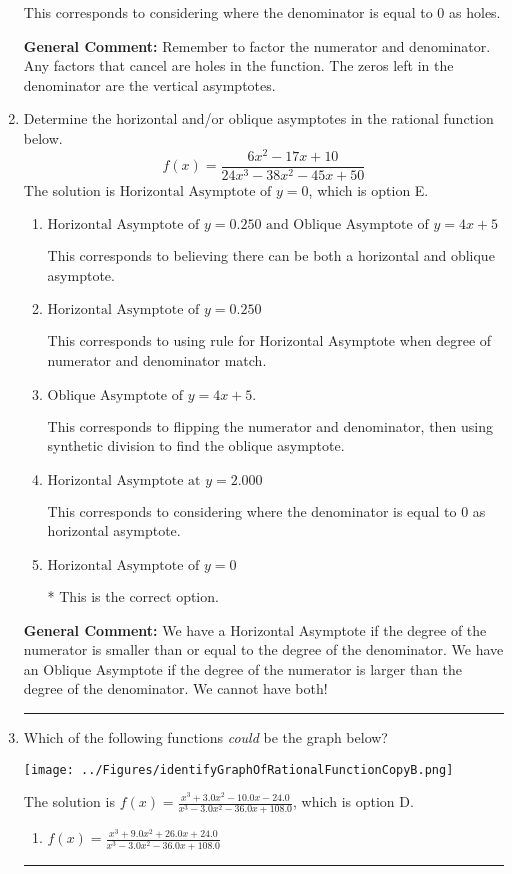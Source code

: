 \documentclass{extbook}[14pt]
\newcommand{\litem}[1]{\item #1

\rule{\textwidth}{0.4pt}}
\begin{document}
\begin{enumerate}
{\begin{enumerate}[label=\Alph*.]
This corresponds to considering where the denominator is equal to 0 as holes.
\end{enumerate}

\textbf{General Comment:} Remember to factor the numerator and denominator. Any factors that cancel are holes in the function. The zeros left in the denominator are the vertical asymptotes.
}
\litem{
Determine the horizontal and/or oblique asymptotes in the rational function below.
\[ f(x) = \frac{6x^{2} -17 x + 10}{24x^{3} -38 x^{2} -45 x + 50} \]The solution is \( \text{Horizontal Asymptote of } y = 0 \), which is option E.\begin{enumerate}[label=\Alph*.]
\item \( \text{Horizontal Asymptote of } y = 0.250 \text{ and Oblique Asymptote of } y = 4x + 5 \)

This corresponds to believing there can be both a horizontal and oblique asymptote.
\item \( \text{Horizontal Asymptote of } y = 0.250  \)

This corresponds to using rule for Horizontal Asymptote when degree of numerator and denominator match.
\item \( \text{Oblique Asymptote of } y = 4x + 5. \)

This corresponds to flipping the numerator and denominator, then using synthetic division to find the oblique asymptote.
\item \( \text{Horizontal Asymptote at } y = 2.000 \)

This corresponds to considering where the denominator is equal to 0 as horizontal asymptote.
\item \( \text{Horizontal Asymptote of } y = 0 \)

* This is the correct option.
\end{enumerate}

\textbf{General Comment:} We have a Horizontal Asymptote if the degree of the numerator is smaller than or equal to the degree of the denominator. We have an Oblique Asymptote if the degree of the numerator is larger than the degree of the denominator. We cannot have both!
}
\litem{
Which of the following functions \textit{could} be the graph below?

\begin{center}
    \texttt{[image: ../Figures/identifyGraphOfRationalFunctionCopyB.png]}
\end{center}


The solution is \( f(x)=\frac{x^{3} +3.0 x^{2} -10.0 x -24.0}{x^{3} -3.0 x^{2} -36.0 x + 108.0} \), which is option D.\begin{enumerate}[label=\Alph*.]
\item \( f(x)=\frac{x^{3} +9.0 x^{2} +26.0 x + 24.0}{x^{3} -3.0 x^{2} -36.0 x + 108.0} \)


\end{enumerate}}
\end{enumerate}
\end{document}

